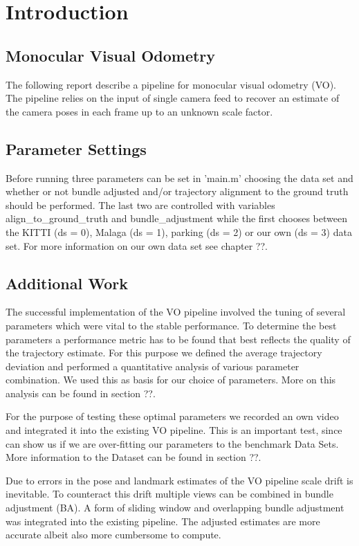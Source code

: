 \chapter{Introduction}

\section{Monocular Visual Odometry}
The following report describe a pipeline for monocular visual odometry (VO). The pipeline relies on the input of single camera feed to recover an estimate of the camera poses in each frame up to an unknown scale factor.  

\section{Parameter Settings}
Before running three parameters can be set in 'main.m' choosing the data set and whether or not bundle adjusted and/or trajectory alignment to the ground truth should be performed. The last two are controlled with variables align\_to\_ground\_truth and bundle\_adjustment while the first chooses between the KITTI (ds = 0), Malaga (ds = 1), parking (ds = 2) or our own (ds = 3) data set. For more information on our own data set see chapter ??.

\section{Additional Work}
The successful implementation of the VO pipeline involved the tuning of several parameters which were vital to the stable performance. To determine the best parameters a performance metric has to be found that best reflects the quality of the trajectory estimate. For this purpose we defined the average trajectory deviation and performed a quantitative analysis of various parameter combination. We used this as basis for our choice of parameters. More on this analysis can be found in section ??. \par
For the purpose of testing these optimal parameters we recorded an own video and integrated it into the existing VO pipeline. This is an important test, since can show us if we are over-fitting our parameters to the benchmark Data Sets. More information to the Dataset can be found in section ??. \par
Due to errors in the pose and landmark estimates of the VO pipeline scale drift is inevitable. To counteract this drift multiple views can be combined in bundle adjustment (BA). A form of sliding window and overlapping bundle adjustment was integrated into the existing pipeline. The adjusted estimates are more accurate albeit also more cumbersome to compute.


